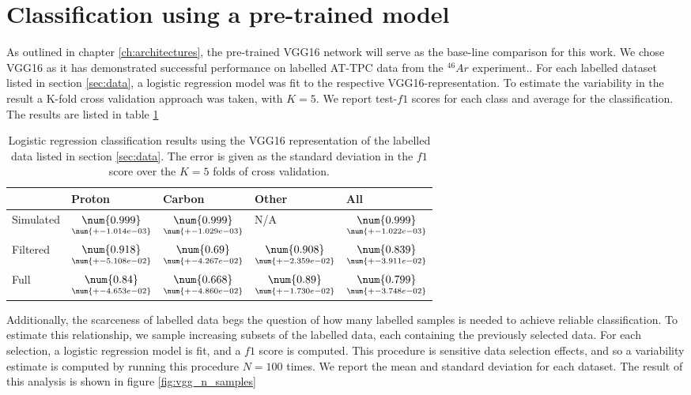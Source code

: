\section{Classification using a pre-trained model}

As outlined in chapter \ref{ch:architectures}, the pre-trained VGG16 network will serve as the base-line comparison for this work. We chose VGG16 as it has demonstrated successful performance on labelled AT-TPC data from the $^{46}Ar$ experiment.\cite{Kuchera2019}. For each labelled dataset listed in section \ref{sec:data}, a logistic regression model was fit to the respective VGG16-representation. To estimate the variability in the result a K-fold cross validation approach was taken, with $K=5$. We report test-$f1$ scores for each class and average for the classification. The results are listed in table \ref{tab:vgg_results}

\begin{table}
\centering
\caption[VGG classification results]{Logistic regression classification results using the VGG16 representation of the labelled data listed in section \ref{sec:data}. The error is given as the standard deviation in the $f1$ score over the $K=5$ folds of cross validation.}\label{tab:vgg_results}
\begin{tabular}{lllll}
\toprule
{} & Proton & Carbon & Other & All \\
\midrule
Simulated &  $\underset{\num{+- 1.014e-03 }  }{\num{ 0.999 } }$ &  $\underset{\num{+- 1.029e-03 }  }{\num{ 0.999 } }$ &  N/A &  $\underset{\num{+- 1.022e-03 }  }{\num{ 0.999 } }$ \\
Filtered  &  $\underset{\num{+- 5.108e-02 }  }{\num{ 0.918 } }$ &  $\underset{\num{+- 4.267e-02 }  }{\num{ 0.69 } }$ &  $\underset{\num{+- 2.359e-02 }  }{\num{ 0.908 } }$ &  $\underset{\num{+- 3.911e-02 }  }{\num{ 0.839 } }$ \\
Full      &  $\underset{\num{+- 4.653e-02 }  }{\num{ 0.84 } }$ &  $\underset{\num{+- 4.860e-02 }  }{\num{ 0.668 } }$ &  $\underset{\num{+- 1.730e-02 }  }{\num{ 0.89 } }$ &  $\underset{\num{+- 3.748e-02 }  }{\num{ 0.799 } }$ \\
\bottomrule
\end{tabular}
\end{table}

 Additionally, the scarceness of labelled data begs the question of how many labelled samples is needed to achieve reliable classification. To estimate this relationship, we sample increasing subsets of the labelled data, each containing the previously selected data. For each selection, a logistic regression model is fit, and a $f1$ score is computed. This procedure is sensitive data selection effects, and so a variability estimate is computed by running this procedure $N=100$ times. We report the mean and standard deviation for each dataset. The result of this analysis is shown in figure \ref{fig:vgg_n_samples}


